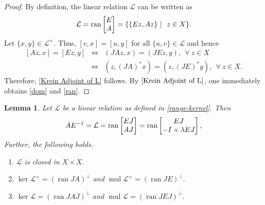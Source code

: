 \documentclass{birkjour}
\newtheorem{lem}[thm]{Lemma}
\theoremstyle{definition}
\theoremstyle{remark}
\numberwithin{equation}{section}
\newcommand{\Ll}{\mathcal L}
\DeclareMathOperator{\ran}{ran}
\DeclareMathOperator{\mul}{mul}
\begin{document}
\begin{proof}
By definition, the linear relation $\Ll$ can be written as $$\mathcal{L} = \textup{ran}\begin{bmatrix}
			E\\ A
			\end{bmatrix}=\{\{
			Ez, Az\}
			 ~|~ \ z\in X\}.$$
Let $\{x,y\}\in \mathcal{L}^{+}$. Thus,  $[v,x]=[u,y]$ for all $\{u,v\} \in \mathcal{L}$ and hence  
\begin{eqnarray} \nonumber     
 [Az,x]=[Ez,y] &\Leftrightarrow &  (JAz,x)=( JEz,y), \ \ \forall \ z \in X \\[1ex]\label{Freitag}
 &\Leftrightarrow & ( z,(JA)^{*} x)= ( z,(JE)^{*} y), \ \ \forall \ z \in X.
\end{eqnarray} 
Therefore, \eqref{Krein Adjoint of L}  follows.
By $\eqref{Krein Adjoint of L}$, one immediately obtains \eqref{dom} and \eqref{ran}.
\end{proof}
 
\begin{lem}  \label{Range representation}
 Let $\mathcal{L}$  be a linear relation as defined in \eqref{range-kernel}. Then 
 \begin{align}\label{Equation 6}
       AE^{-1}= \mathcal{L}= \textup{ran}\begin{bmatrix}
			EJ\\ AJ
			\end{bmatrix}= \textup{ran}\begin{bmatrix}
			EJ\\ -I+\lambda EJ
			\end{bmatrix},
    \end{align} 
 Further, the following holds.
 \begin{enumerate}
    \item $\mathcal{L}$ is closed in $X\times X.$
    \item $\ker\Ll^+= (\ran JA) ^\perp$ and $\mul\Ll^+= (\ran JE) ^\perp.$
    \item  $\ker\Ll= (\ran JAJ) ^\perp$ and $\mul\Ll= (\ran JEJ) ^\perp.$
\end{enumerate} 
\end{lem}
\end{document}
